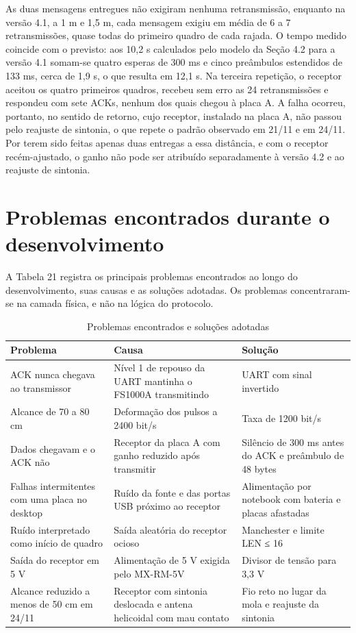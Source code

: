 \documentclass[12pt, oneside, a4paper, sumario=tradicional, chapter=TITLE, brazilian]{abntex2}
\renewcommand{\arraystretch}{1.3}
\begin{document}
As duas mensagens entregues não exigiram nenhuma retransmissão, enquanto na versão 4.1, a 1 m e 1,5 m, cada mensagem exigiu em média de 6 a 7 retransmissões, quase todas do primeiro quadro de cada rajada. O tempo medido coincide com o previsto: aos 10,2 s calculados pelo modelo da Seção 4.2 para a versão 4.1 somam-se quatro esperas de 300 ms e cinco preâmbulos estendidos de 133 ms, cerca de 1,9 s, o que resulta em 12,1 s. Na terceira repetição, o receptor aceitou os quatro primeiros quadros, recebeu sem erro as 24 retransmissões e respondeu com sete ACKs, nenhum dos quais chegou à placa A. A falha ocorreu, portanto, no sentido de retorno, cujo receptor, instalado na placa A, não passou pelo reajuste de sintonia, o que repete o padrão observado em 21/11 e em 24/11. Por terem sido feitas apenas duas entregas a essa distância, e com o receptor recém-ajustado, o ganho não pode ser atribuído separadamente à versão 4.2 e ao reajuste de sintonia.

\section{Problemas encontrados durante o desenvolvimento}

A Tabela 21 registra os principais problemas encontrados ao longo do desenvolvimento, suas causas e as soluções adotadas. Os problemas concentraram-se na camada física, e não na lógica do protocolo.

\begin{table}[H]
  \centering
  \caption{Problemas encontrados e soluções adotadas}
  \small\renewcommand{\arraystretch}{1.3}
  \begin{tabular}{|>{\raggedright\arraybackslash}m{4.21cm}|>{\centering\arraybackslash}m{5.31cm}|>{\centering\arraybackslash}m{5.13cm}|}
  \hline
  \rowcolor{gray!22}\textbf{Problema} & \textbf{Causa} & \textbf{Solução} \\ \hline
  ACK nunca chegava ao transmissor & Nível 1 de repouso da UART mantinha o FS1000A transmitindo & UART com sinal invertido \\ \hline
  Alcance de 70 a 80 cm & Deformação dos pulsos a 2400 bit/s & Taxa de 1200 bit/s \\ \hline
  Dados chegavam e o ACK não & Receptor da placa A com ganho reduzido após transmitir & Silêncio de 300 ms antes do ACK e preâmbulo de 48 bytes \\ \hline
  Falhas intermitentes com uma placa no desktop & Ruído da fonte e das portas USB próximo ao receptor & Alimentação por notebook com bateria e placas afastadas \\ \hline
  Ruído interpretado como início de quadro & Saída aleatória do receptor ocioso & Manchester e limite LEN ≤ 16 \\ \hline
  Saída do receptor em 5 V & Alimentação de 5 V exigida pelo MX-RM-5V & Divisor de tensão para 3,3 V \\ \hline
  Alcance reduzido a menos de 50 cm em 24/11 & Receptor com sintonia deslocada e antena helicoidal com mau contato & Fio reto no lugar da mola e reajuste da sintonia \\ \hline
  \end{tabular}
\end{table}
\end{document}
